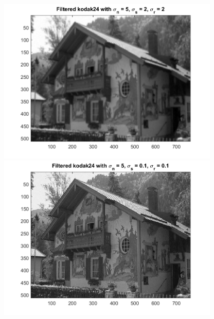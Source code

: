 \documentclass{article}
\begin{document}
\begin{figure}[!htb]
    \centering
    \begin{minipage}[b]{0.3\textwidth}
        \includegraphics[width=\textwidth]{kodak24_5_2_2_6.png}
    \end{minipage}
    \begin{minipage}[b]{0.3\textwidth}
        \includegraphics[width=\textwidth]{kodak24_5_0.1_0.1_8.png}
    \end{minipage}
    \begin{minipage}[b]{0.3\textwidth}

\end{minipage}
\end{figure}
\end{document}
